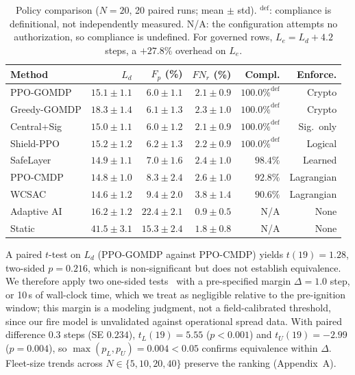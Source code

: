 \documentclass[letterpaper]{article} %
\newcommand{\Le}{L_e}
\newcommand{\appNotation}{A}
\begin{document}
\begin{table}[!t]
\caption{Policy comparison ($N{=}20$, 20 paired runs; mean $\pm$ std). $^{\mathrm{def}}$: compliance is definitional, not independently measured. N/A: the configuration attempts no authorization, so compliance is undefined. For governed rows, $\Le=L_d+4.2$ steps, a $+27.8\%$ overhead on $\Le$.}
\label{tab:rl_comparison}
\centering
\setlength{\tabcolsep}{2pt}
\scriptsize
\begin{tabular}{@{}lrrrrr@{}}
\toprule
\textbf{Method} & $L_d$ & $F_p$ (\%) & $FN_r$ (\%) & \textbf{Compl.} & \textbf{Enforce.} \\
\midrule
PPO-GOMDP & $15.1\!\pm\!1.1$ & $6.0\!\pm\!1.1$ & $2.1\!\pm\!0.9$ & $\mathbf{100.0\%}^{\mathrm{def}}$ & Crypto \\
Greedy-GOMDP & $18.3\!\pm\!1.4$ & $6.1\!\pm\!1.3$ & $2.3\!\pm\!1.0$ & $\mathbf{100.0\%}^{\mathrm{def}}$ & Crypto \\
Central+Sig & $15.0\!\pm\!1.1$ & $6.0\!\pm\!1.2$ & $2.1\!\pm\!0.9$ & $\mathbf{100.0\%}^{\mathrm{def}}$ & Sig.\ only \\
Shield-PPO & $15.2\!\pm\!1.2$ & $6.2\!\pm\!1.3$ & $2.2\!\pm\!0.9$ & $100.0\%^{\mathrm{def}}$ & Logical \\
SafeLayer & $14.9\!\pm\!1.1$ & $7.0\!\pm\!1.6$ & $2.4\!\pm\!1.0$ & $98.4\%$ & Learned \\
PPO-CMDP & $14.8\!\pm\!1.0$ & $8.3\!\pm\!2.4$ & $2.6\!\pm\!1.0$ & $92.8\%$ & Lagrangian \\
WCSAC & $14.6\!\pm\!1.2$ & $9.4\!\pm\!2.0$ & $3.8\!\pm\!1.4$ & $90.6\%$ & Lagrangian \\
Adaptive AI & $16.2\!\pm\!1.2$ & $22.4\!\pm\!2.1$ & $0.9\!\pm\!0.5$ & N/A & None \\
Static & $41.5\!\pm\!3.1$ & $15.3\!\pm\!2.4$ & $1.8\!\pm\!0.8$ & N/A & None \\
\bottomrule
\end{tabular}
\end{table}

A paired $t$-test on $L_d$ (PPO-GOMDP against PPO-CMDP) yields $t(19)=1.28$, two-sided $p=0.216$, which is non-significant but does not establish equivalence. We therefore apply two one-sided tests~\citep{lakens2017equivalence} with a pre-specified margin $\Delta=1.0$ step, or 10\,s of wall-clock time, which we treat as negligible relative to the pre-ignition window; this margin is a modeling judgment, not a field-calibrated threshold, since our fire model is unvalidated against operational spread data. With paired difference $0.3$ steps (SE $0.234$), $t_L(19)=5.55$ ($p<0.001$) and $t_U(19)=-2.99$ ($p=0.004$), so $\max(p_L,p_U)=0.004<0.05$ confirms equivalence within $\Delta$. Fleet-size trends across $N\in\{5,10,20,40\}$ preserve the ranking (Appendix~\appNotation).
\end{document}
